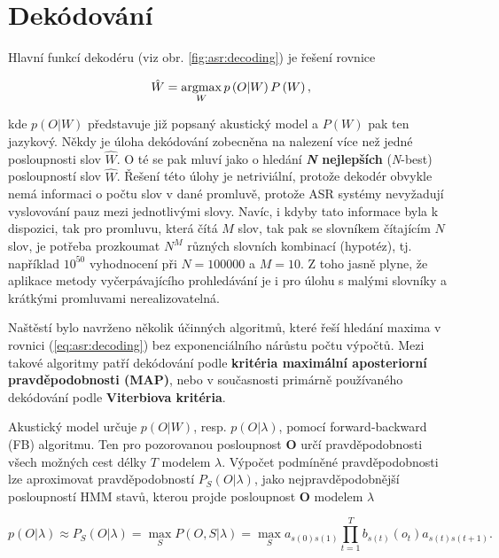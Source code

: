 \section{Dekódování}
\label{chap:asr:decoding}

Hlavní funkcí dekodéru (viz obr. \ref{fig:asr:decoding}) je řešení rovnice

\begin{equation}
  \hat{W} = \operatorname*{argmax}_{W} p\left(O | W\right)P\left(W\right),
  \label{eq:asr:decoding:decoder}
\end{equation}

\noindent kde $p\left(O|W\right)$ představuje již popsaný akustický model a $P\left(W\right)$ pak ten jazykový. Někdy je úloha dekódování zobecněna na nalezení více než jedné posloupnosti slov $\hat{W}$. O té se pak mluví jako o hledání \textbf{\textit{N} nejlepších} (\textit{N}-best) posloupností slov $\hat{W}$.  Řešení této úlohy je netriviální, protože dekodér obvykle nemá informaci o počtu slov v dané promluvě, protože ASR systémy nevyžadují vyslovování pauz mezi jednotlivými slovy. Navíc, i kdyby tato informace byla k dispozici, tak pro promluvu, která čítá $M$ slov, tak pak se slovníkem čítajícím $N$ slov, je potřeba prozkoumat $N^{M}$ různých slovních kombinací (hypotéz), tj. například $10^{50}$ vyhodnocení při $N=100000$ a $M=10$. Z toho jasně plyne, že aplikace metody vyčerpávajícího prohledávání je i pro úlohu s malými slovníky a krátkými promluvami nerealizovatelná.

Naštěstí bylo navrženo několik účinných algoritmů, které řeší hledání maxima v rovnici (\ref{eq:asr:decoding}) bez exponenciálního nárůstu počtu výpočtů. Mezi takové algoritmy patří dekódování podle \textbf{kritéria maximální aposteriorní pravděpodobnosti (MAP)}, nebo v současnosti primárně používaného dekódování podle \textbf{Viterbiova kritéria}.

Akustický model určuje $p\left(O|W\right)$, resp. $p\left(O|\lambda\right)$, pomocí forward-backward (FB) algoritmu. Ten pro pozorovanou posloupnost $\boldsymbol{O}$ určí pravděpodobnosti všech možných cest délky $T$ modelem $\lambda$. Výpočet podmíněné pravděpodobnosti lze aproximovat pravděpodobností $P_S(O|\lambda)$, jako nejpravděpodobnější posloupností HMM stavů, kterou projde posloupnost $\boldsymbol{O}$ modelem $\lambda$

\begin{equation}
  p\left(O|\lambda\right) \approx P_S\left(O|\lambda\right) = \max_S P\left(O, S| \lambda \right) = \max_S a_{s\left(0\right)s\left(1\right)} \prod_{t=1}^{T} b_{s\left(t\right)}\left(o_t\right) a_{s\left(t\right)s\left(t+1\right)}.
  \label{eq:asr:decoding:approx}
\end{equation}

